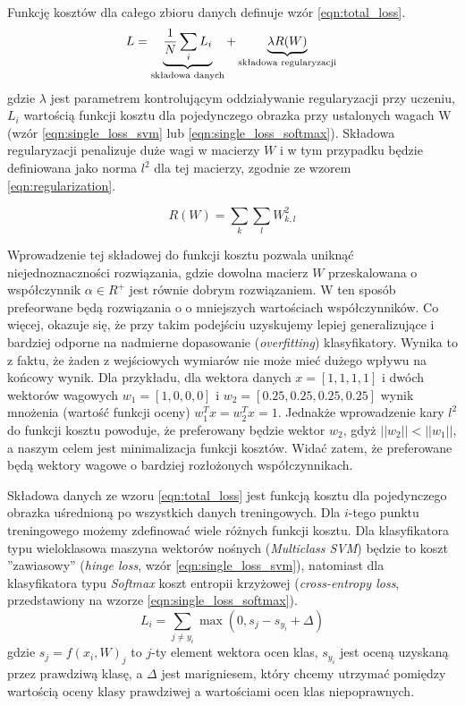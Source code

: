 Funkcję kosztów dla całego zbioru danych definuje wzór \ref{eqn:total_loss}.
\begin{equation}\label{eqn:total_loss}
L =  \underbrace{ \frac{1}{N} \sum_i L_i }_\text{składowa danych} + \underbrace{ \lambda R(W) }_\text{składowa regularyzacji} \\\\
\end{equation}
gdzie $\lambda$ jest parametrem kontrolującym oddziaływanie regularyzacji przy uczeniu, $L_i$ wartością funkcji kosztu dla pojedynczego obrazka przy ustalonych wagach W (wzór \ref{eqn:single_loss_svm} lub \ref{eqn:single_loss_softmax}).
Składowa regularyzacji penalizuje duże wagi w macierzy $W$ i w tym przypadku będzie definiowana jako norma $l^2$ dla tej macierzy, zgodnie ze wzorem \ref{eqn:regularization}.

\begin{equation}\label{eqn:regularization}
R(W) = \sum_k\sum_l W_{k,l}^2
\end{equation}

Wprowadzenie tej składowej do funkcji kosztu pozwala uniknąć niejednoznaczności rozwiązania, gdzie dowolna macierz $W$ przeskalowana o współczynnik $\alpha \in R^+$ jest równie dobrym rozwiązaniem.
W ten sposób prefeorwane będą rozwiązania o o mniejszych wartościach współczynników.
Co więcej, okazuje się, że przy takim podejściu uzyskujemy lepiej generalizujące i bardziej odporne na nadmierne dopasowanie (\textit{overfitting}) klasyfikatory.
Wynika to z faktu, że żaden z wejściowych wymiarów nie może mieć dużego wpływu na końcowy wynik.
Dla przykładu, dla wektora danych $x = [1,1,1,1]$ i dwóch wektorów wagowych $w_1 = [1,0,0,0]$ i $w_2 = [0.25,0.25,0.25,0.25]$ wynik mnożenia (wartość funkcji oceny) $w_1^Tx = w_2^Tx = 1$.
Jednakże wprowadzenie kary $l^2$ do funkcji kosztu powoduje, że preferowany będzie wektor $w_2$, gdyż $||w_2|| < ||w_1||$, a naszym celem jest minimalizacja funkcji kosztów.
Widać zatem, że preferowane będą wektory wagowe o bardziej rozłożonych współczynnikach.

Składowa danych ze wzoru \ref{eqn:total_loss} jest funkcją kosztu dla pojedynczego obrazka uśrednioną po wszystkich danych treningowych.
Dla $i$-tego punktu treningowego możemy zdefinować wiele różnych funkcji kosztu.
Dla klasyfikatora typu wieloklasowa maszyna wektorów nośnych (\textit{Multiclass SVM}) będzie to koszt ''zawiasowy'' (\textit{hinge loss}, wzór \ref{eqn:single_loss_svm}), natomiast dla klasyfikatora typu \textit{Softmax} koszt entropii krzyżowej (\textit{cross-entropy loss}, przedstawiony na wzorze \ref{eqn:single_loss_softmax}).
\begin{equation}\label{eqn:single_loss_svm}
L_i = \sum_{j\neq y_i} \max(0, s_j - s_{y_i} + \Delta)
\end{equation}
gdzie $s_j = f(x_i, W)_j$ to $j$-ty element wektora ocen klas, $s_{y_i}$ jest oceną uzyskaną przez prawdziwą klasę, a $\Delta$ jest marigniesem, który chcemy utrzymać pomiędzy wartością oceny klasy prawdziwej a wartościami ocen klas niepoprawnych.

